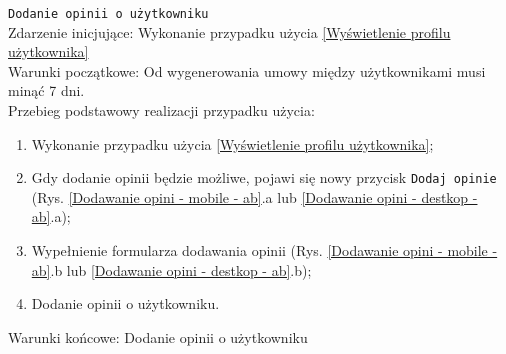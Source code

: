 \texttt{Dodanie opinii o użytkowniku} \\
Zdarzenie inicjujące: Wykonanie przypadku użycia \ref{Wyświetlenie profilu użytkownika} \\
Warunki początkowe: Od wygenerowania umowy między użytkownikami musi minąć 7 dni. \\
Przebieg podstawowy realizacji przypadku użycia: \\
\begin{enumerate}
   \item Wykonanie przypadku użycia \ref{Wyświetlenie profilu użytkownika};
   \item Gdy dodanie opinii będzie możliwe, pojawi się nowy przycisk \texttt{Dodaj opinie} (Rys. \ref{Dodawanie opini - mobile - ab}.a lub \ref{Dodawanie opini - destkop - ab}.a);
   \item Wypełnienie formularza dodawania opinii (Rys. \ref{Dodawanie opini - mobile - ab}.b lub \ref{Dodawanie opini - destkop - ab}.b);
   \item Dodanie opinii o użytkowniku.
\end{enumerate}
Warunki końcowe: Dodanie opinii o użytkowniku \\
